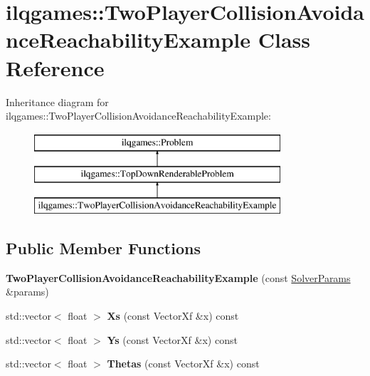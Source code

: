 \hypertarget{classilqgames_1_1_two_player_collision_avoidance_reachability_example}{}\section{ilqgames\+:\+:Two\+Player\+Collision\+Avoidance\+Reachability\+Example Class Reference}
\label{classilqgames_1_1_two_player_collision_avoidance_reachability_example}
Inheritance diagram for ilqgames\+:\+:Two\+Player\+Collision\+Avoidance\+Reachability\+Example\+:\begin{figure}[H]
\begin{center}
\leavevmode
\includegraphics[height=3.000000cm]{classilqgames_1_1_two_player_collision_avoidance_reachability_example}
\end{center}
\end{figure}
\subsection*{Public Member Functions}
\begin{DoxyCompactItemize}
\item 
{\bfseries Two\+Player\+Collision\+Avoidance\+Reachability\+Example} (const \hyperlink{structilqgames_1_1_solver_params}{Solver\+Params} \&params)\hypertarget{classilqgames_1_1_two_player_collision_avoidance_reachability_example_a278e42986ce843ad33cb39582d21a133}{}\label{classilqgames_1_1_two_player_collision_avoidance_reachability_example_a278e42986ce843ad33cb39582d21a133}

\item 
std\+::vector$<$ float $>$ {\bfseries Xs} (const Vector\+Xf \&x) const \hypertarget{classilqgames_1_1_two_player_collision_avoidance_reachability_example_a2dbaaca879881d680bc97e343ee740c8}{}\label{classilqgames_1_1_two_player_collision_avoidance_reachability_example_a2dbaaca879881d680bc97e343ee740c8}

\item 
std\+::vector$<$ float $>$ {\bfseries Ys} (const Vector\+Xf \&x) const \hypertarget{classilqgames_1_1_two_player_collision_avoidance_reachability_example_a3c38c51507c4dd283f46c5d2f6bac904}{}\label{classilqgames_1_1_two_player_collision_avoidance_reachability_example_a3c38c51507c4dd283f46c5d2f6bac904}

\item 
std\+::vector$<$ float $>$ {\bfseries Thetas} (const Vector\+Xf \&x) const \hypertarget{classilqgames_1_1_two_player_collision_avoidance_reachability_example_a752e409bb07ebaf78da1a4f9afe7ca81}{}\label{classilqgames_1_1_two_player_collision_avoidance_reachability_example_a752e409bb07ebaf78da1a4f9afe7ca81}

\end{DoxyCompactItemize}
